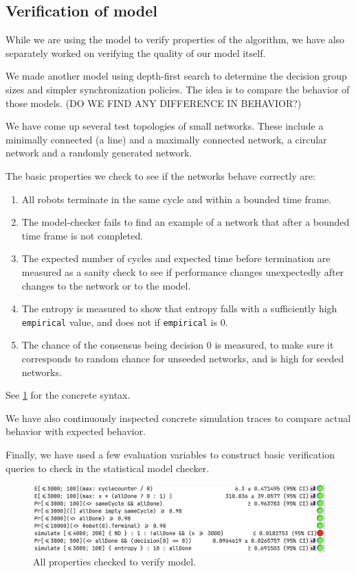 \subsection{Verification of model}

While we are using the model to verify properties of the algorithm, we have also separately worked on verifying the quality of our model itself.

We made another model using depth-first search to determine the decision group sizes and simpler synchronization policies. 
The idea is to compare the behavior of those models. (DO WE FIND ANY DIFFERENCE IN BEHAVIOR?)

We have come up several test topologies of small networks. 
These include a minimally connected (a line) and a maximally connected network, a circular network and a randomly generated network.

The basic properties we check to see if the networks behave correctly are:

\begin{enumerate}
    \item All robots terminate in the same cycle and within a bounded time frame.
    \item The model-checker fails to find an example of a network that after a bounded time frame is not completed.
    \item The expected number of cycles and expected time before termination are measured as a sanity check to see if performance changes unexpectedly after changes to the network or to the model.
    \item The entropy is measured to show that entropy falls with a sufficiently high \texttt{empirical} value, and does not if \texttt{empirical} is 0.
    \item The chance of the consensus being decision 0 is measured, to make sure it corresponds to random chance for unseeded networks, and is high for seeded networks.
\end{enumerate}

See \ref{fig:properties} for the concrete syntax.

We have also continuously inspected concrete simulation traces to compare actual behavior with expected behavior.

Finally, we have used a few evaluation variables to construct basic verification queries to check in the statistical model checker.

\begin{figure}[H]
    \centering
    \includegraphics[width=\linewidth]{pictures/Properties.png}
    \caption{All properties checked to verify model.}
    \label{fig:properties}
\end{figure}

